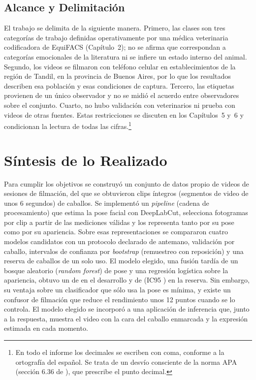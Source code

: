 \subsection{Alcance y Delimitación}
El trabajo se delimita de la siguiente manera. Primero, las clases son tres categorías de trabajo definidas operativamente por una médica veterinaria codificadora de EquiFACS (Capítulo~2); no se afirma que correspondan a categorías emocionales de la literatura ni se infiere un estado interno del animal. Segundo, los videos se filmaron con teléfono celular en establecimientos de la región de Tandil, en la provincia de Buenos Aires, por lo que los resultados describen esa población y esas condiciones de captura. Tercero, las etiquetas provienen de un único observador y no se midió el acuerdo entre observadores sobre el conjunto. Cuarto, no hubo validación con veterinarios ni prueba con videos de otras fuentes. Estas restricciones se discuten en los Capítulos~5 y~6 y condicionan la lectura de todas las cifras.\footnote{En todo el informe los decimales se escriben con coma, conforme a la ortografía del español. Se trata de un desvío consciente de la norma APA (sección 6.36 de \textcite{apa2020}), que prescribe el punto decimal.}

\section{Síntesis de lo Realizado}
Para cumplir los objetivos se construyó un conjunto de datos propio de \VideosTotal{} videos de \SesionesTotal{} sesiones de filmación, del que se obtuvieron \ClipsTotal{} clips íntegros (segmentos de video de unos 6 segundos) de \CaballosTotal{} caballos. Se implementó un \textit{pipeline} (cadena de procesamiento) que estima la pose facial con DeepLabCut, selecciona \Fotogramas{} fotogramas por clip a partir de las mediciones válidas y los representa tanto por su pose como por su apariencia. Sobre esas representaciones se compararon cuatro modelos candidatos con un protocolo declarado de antemano, validación por caballo, intervalos de confianza por \textit{bootstrap} (remuestreo con reposición) y una reserva de caballos de un solo uso. El modelo elegido, una fusión tardía de un bosque aleatorio (\textit{random forest}) de pose y una regresión logística sobre la apariencia, obtuvo un \fmacro{} de \FusionDevF{} en el desarrollo y de \FusionReservaF{} (IC95 \FusionReservaIC{}) en la reserva. Sin embargo, su ventaja sobre un clasificador que sólo usa la pose es mínima, y existe un confusor de filmación que reduce el rendimiento unos 12 puntos cuando se lo controla. El modelo elegido se incorporó a una aplicación de inferencia que, junto a la respuesta, muestra el video con la cara del caballo enmarcada y la expresión estimada en cada momento.


